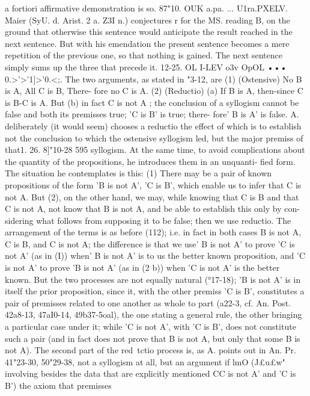 {{{{{{{{{{{{{{{{{{{{{{{{{{{{{{{{{a fortiori affirmative demonstration is so.
87"10. OUK a.pa. ... U1ra.PXELV. Maier (SyU. d. Arist. 2 a. Z3I n.)
conjectures r for the MS. reading B, on the ground that otherwise
this sentence would anticipate the result reached in the next
sentence. But with his emendation the present sentence becomes
a mere repetition of the previous one, so that nothing is gained.
The next sentence simply sums up the three that precede it.
12-25. OL I-LEV o3v OpOL ••• 0.>'>'1]>'0.<;. The two arguments, as
stated in "3-12, are (1) (Ostensive) No B is A, All C is B, There-
fore no C is A. (2) (Reductio) (a) If B is A, then-since C is B-C
is A. But (b) in fact C is not A ; the conclusion of a syllogism
cannot be false and both its premisses true; 'C is B' is true; there-
fore' B is A' is false. A. deliberately (it would seem) chooses a
reductio the effect of which is to establish not the conclusion to
which the ostensive syllogism led, but the major premiss of that1. 26. 8]"10-28
595
syllogism. At the same time, to avoid complications about the
quantity of the propositions, he introduces them in an unquanti-
fied form. The situation he contemplates is this: (1) There may
be a pair of known propositions of the form 'B is not A', 'C is
B', which enable us to infer that C is not A. But (2), on the other
hand, we may, while knowing that C is B and that C is not A, not
know that B is not A, and be able to establish this only by con-
sidering what follows from supposing it to be false; then we use
reductio. The arrangement of the terms is as before (112); i.e.
in fact in both cases B is not A, C is B, and C is not A; the
difference is that we use' B is not A' to prove 'C is not A' (as in
(I)) when' B is not A' is to us the better known proposition, and
'C is not A' to prove 'B is not A' (as in (2 b)) when 'C is not A'
is the better known. But the two processes are not equally
natural (°17-18); 'B is not A' is in itself the prior proposition,
since it, with the other premiss 'C is B', constitutes a pair of
premisses related to one another as whole to part (a22-3, cf.
An. Post. 42a8-13, 47aI0-14, 49b37-5oal), the one stating a general
rule, the other bringing a particular case under it; while 'C is
not A', with 'C is B', does not constitute such a pair (and in fact
does not prove that B is not A, but only that some B is not A).
The second part of the red~tctio process is, as A. points out in
An. Pr. 41"23-30, 50"29-38, not a syllogism at all, but an argument
if lmO (J£u£w" involving besides the data that are explicitly
mentioned CC is not A' and 'C is B') the axiom that premisses
}}}}}}}}}}}}}}}}}}}}}}}}}}}}}}}}}
